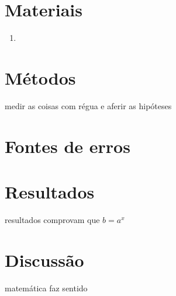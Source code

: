 \documentclass[a4paper, 12pt]{article}
\begin{document}
\section{Materiais}
    \begin{enumerate}
        \item{}
    \end{enumerate}

\section{Métodos}
    medir as coisas com régua e aferir as hipóteses

\section{Fontes de erros}

\section{Resultados}
    resultados comprovam que $b=a^x$

\section{Discussão}
    matemática faz sentido

\pagebreak



\nocite{apostilai}
\nocite{apostilaii}
\nocite{nussenzveig2013curso}
\nocite{halliday2013fundamentals}
\end{document}
